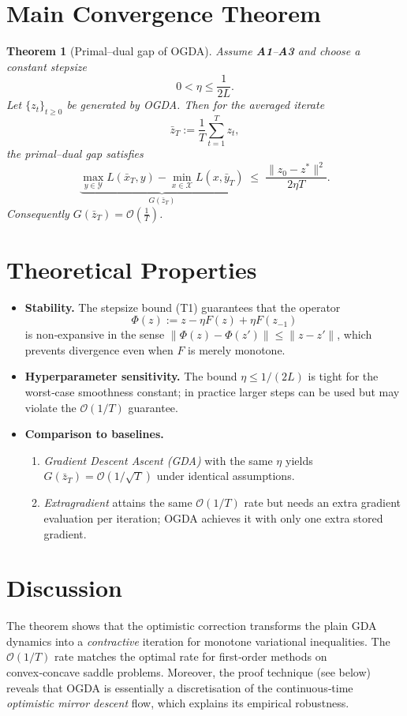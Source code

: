 \documentclass{article}
\newtheorem{theorem}{Theorem}
\begin{document}
\section*{Main Convergence Theorem}
\begin{theorem}[Primal–dual gap of OGDA]\label{thm:ogda}
Assume \textbf{A1}–\textbf{A3} and choose a constant stepsize 
\[
0<\eta\le \frac{1}{2L}.
\tag{T1}
\]
Let $\{z_t\}_{t\ge0}$ be generated by OGDA. Then for the averaged iterate
\[
\bar z_T:=\frac{1}{T}\sum_{t=1}^{T}z_t,
\]
the primal–dual gap satisfies
\[
\underbrace{\max_{y\in\mathcal Y}L(\bar x_T,y)-\min_{x\in\mathcal X}L(x,\bar y_T)}_{\displaystyle G(\bar z_T)}
\;\le\; \frac{\|z_0-z^{*}\|^{2}}{2\eta T}.
\tag{T2}
\]
Consequently $G(\bar z_T)=\mathcal O\!\left(\frac{1}{T}\right)$.
\end{theorem}

\section*{Theoretical Properties}
\begin{itemize}
\item \textbf{Stability.} The stepsize bound (T1) guarantees that the operator
\[
\Phi(z):=z-\eta F(z)+\eta F(z_{-1})
\]
is non‑expansive in the sense $\|\Phi(z)-\Phi(z')\|\le\|z-z'\|$, which prevents divergence even when $F$ is merely monotone.
\item \textbf{Hyperparameter sensitivity.} The bound $\eta\le 1/(2L)$ is tight for the worst‑case smoothness constant; in practice larger steps can be used but may violate the $\mathcal O(1/T)$ guarantee.
\item \textbf{Comparison to baselines.}
    \begin{enumerate}
        \item \emph{Gradient Descent Ascent (GDA)} with the same $\eta$ yields $G(\bar z_T)=\mathcal O(1/\sqrt{T})$ under identical assumptions.
        \item \emph{Extragradient} attains the same $\mathcal O(1/T)$ rate but needs an extra gradient evaluation per iteration; OGDA achieves it with only one extra stored gradient.
    \end{enumerate}
\end{itemize}

\section*{Discussion}
The theorem shows that the optimistic correction transforms the plain GDA dynamics into a \emph{contractive} iteration for monotone variational inequalities. The $\mathcal O(1/T)$ rate matches the optimal rate for first‑order methods on convex‑concave saddle problems. Moreover, the proof technique (see below) reveals that OGDA is essentially a discretisation of the continuous‑time \emph{optimistic mirror descent} flow, which explains its empirical robustness.
\end{document}
